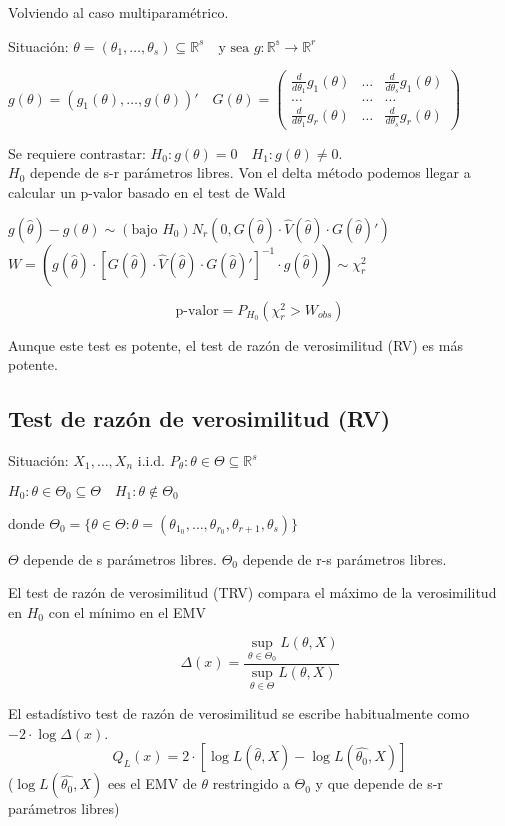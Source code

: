 Volviendo al caso multiparamétrico.

Situación: $\theta=(\theta_1,\dots,\theta_s) \subseteq \mathbb{R}^s \quad \text{y sea }g:\mathbb{R^s}\to \mathbb{R}^r$

\(
g(\theta)=(g_1(\theta),\dots,g(\theta))'
\quad G(\theta)=
\begin{pmatrix}
    \frac{d}{d \theta_1} g_1(\theta) & \dots &  \frac{d}{d \theta_s} g_1(\theta) \\
    \dots & \dots & \dots \\
    \frac{d}{d \theta_1} g_r(\theta) & \dots &  \frac{d}{d \theta_s} g_r(\theta)
\end{pmatrix}
\)

Se requiere contrastar: $H_0:g(\theta)=0 \quad H_1:g(\theta) \neq 0$.
\\ $H_0$ depende de s-r parámetros libres. Von el delta método podemos llegar a calcular un p-valor basado en el test de Wald

\(
g(\hat{\theta})-g(\theta) \sim (\text{bajo }H_0) N_r(0,G(\hat{\theta})\cdot \hat{V}(\hat{\theta})\cdot G(\hat{\theta})')
\)
\(
W=(g(\hat{\theta})\cdot [G(\hat{\theta})\cdot \hat{V}(\hat{\theta})\cdot G(\hat{\theta})']^{-1} \cdot g(\hat{\theta})) \sim \chi^2_r
\)

\[
\text{p-valor}=P_{H_0}(\chi^2_r>W_{obs})
\]

Aunque este test es potente, el test de razón de verosimilitud (RV) es más potente.

\subsection{Test de razón de verosimilitud (RV)}

Situación: $X_1,\dots,X_n$ i.i.d. $P_\theta:\theta \in \Theta \subseteq \mathbb{R}^s$

\(
H_0: \theta \in \Theta_0 \subseteq \Theta \quad H_1: \theta \notin \Theta_0
\)

donde $\Theta_0=\{
    \theta \in \Theta: \theta=(\theta_{1_0},\dots,\theta_{r_0},\theta_{r+1},\theta_s)
\}$

$\Theta$ depende de s parámetros libres. $\Theta_0$ depende de r-s parámetros libres.

El test de razón de verosimilitud (TRV) compara el máximo de la verosimilitud en $H_0$ con el mínimo en el EMV

\[
\Delta(x)=\frac{\sup_{\theta \in \Theta_0} L(\theta,X)}{\sup_{\theta \in \Theta} L(\theta,X)}
\]

El estadístivo test de razón de verosimilitud se escribe habitualmente como $-2 \cdot \log \Delta(x)$.
\[
Q_L(x)=2 \cdot [\log L(\hat{\theta},X)-\log L(\hat{\theta_0},X)]
\]
($\log L(\hat{\theta_0},X)$ ees el EMV de $\theta$ restringido a $\Theta_0$ y que depende de s-r parámetros libres)

